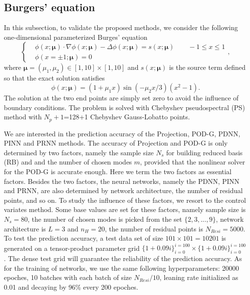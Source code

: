 \documentclass[preprint, 10pt]{elsarticle}
\begin{document}
\subsection{Burgers' equation}
In this subsection, to validate the proposed methods, we consider the  following one-dimensional parameterized Burges' equation
\begin{equation}
\left\{
\begin{aligned}
	 &\phi(x;\pmb{\mu}) \cdot \nabla \phi(x;\pmb{\mu}) -  \Delta \phi(x;\pmb{\mu})= s(x;\pmb{\mu})  \qquad -1 \le x \le 1\\
	 &\phi\left ( x= \pm1; \pmb {\mu} \right ) = 0
\end{aligned}\right.
,
\end{equation}
where $\pmb{\mu} =(\mu_1, \mu_2) \in [1,10] \times [1,10]$ and $s(x;\pmb{\mu})$ is the source term defined so that the exact solution satisfies
\begin{equation}
	\phi(x; \pmb{\mu}) = (1+\mu_1 x)\sin(-\mu_2 x/3) (x^2-1) .
\end{equation}
The solution at the two end points are simply set zero to avoid the influence of boundary conditions. The problem is solved with Chebyshev pseudospectral (PS) method with $N_p+1$=128+1 Chebyshev Gauss-Lobatto points.


We are interested in the prediction accuracy of the Projection, POD-G, PDNN, PINN and PRNN methods. The accuracy of Projection and POD-G is only determined by two factors, namely the sample size $N_s$ for building reduced basis (RB) and and the number of chosen modes $m$, provided that the nonlinear solver for the POD-G is accurate enough. Here we term the two factors as essential factors.
Besides the two factors, the neural networks,  namely the PDNN, PINN and PRNN,  are also determined by network architecture, the number of residual points, and so on. To study the influence of these factors, we resort to the control variates method. Some base values are set for these factors, namely sample size is $N_s=80$, the number of chosen modes is picked from the set $\{2,3,...,9\}$,  network architecture is $L=3$ and $n_H=20$, the number of residual points is $N_{Resi}=5000$. To test the prediction accuracy, a test data set of size $101 \times 101=10201$ is generated on a tensor-product parameter grid $\{1+ 0.09i\}_{i=0}^{i=100} \times \{1+ 0.09i\}_{i=0}^{i=100}$. The dense test grid will guarantee the reliability of the prediction accuracy. As for the training of networks, we use the same following hyperparameters: 20000 epoches, 10 batches with each batch of size $N_{Resi}/10$, leaning rate initialized as 0.01 and decaying by 96\% every 200 epoches.
\end{document}
